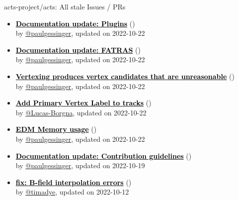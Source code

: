 \begin{frame}[allowframebreaks]{ acts-project/acts: All stale Issues / PRs}
\begin{itemize}
    \item\iss\prstale\textbf{\href{https://github.com/acts-project/acts/issues/1421}{\textcolor{black}{Documentation update: Plugins}}}
    (\href{https://github.com/acts-project/acts/issues/1421}{}) \\
    by \href{https://github.com/paulgessinger}{@paulgessinger}, updated on 2022-10-22

    \item\iss\prstale\textbf{\href{https://github.com/acts-project/acts/issues/1419}{\textcolor{black}{Documentation update: FATRAS}}}
    (\href{https://github.com/acts-project/acts/issues/1419}{}) \\
    by \href{https://github.com/paulgessinger}{@paulgessinger}, updated on 2022-10-22

    \item\iss\prstale\textbf{\href{https://github.com/acts-project/acts/issues/1361}{\textcolor{black}{Vertexing produces vertex candidates that are unreasonable}}}
    (\href{https://github.com/acts-project/acts/issues/1361}{}) \\
    by \href{https://github.com/paulgessinger}{@paulgessinger}, updated on 2022-10-22

    \item\iss\prstale\textbf{\href{https://github.com/acts-project/acts/issues/1544}{\textcolor{black}{Add Primary Vertex Label to tracks}}}
    (\href{https://github.com/acts-project/acts/issues/1544}{}) \\
    by \href{https://github.com/Lucas-Borgna}{@Lucas-Borgna}, updated on 2022-10-22

    \item\iss\prstale\textbf{\href{https://github.com/acts-project/acts/issues/1516}{\textcolor{black}{EDM Memory usage}}}
    (\href{https://github.com/acts-project/acts/issues/1516}{}) \\
    by \href{https://github.com/paulgessinger}{@paulgessinger}, updated on 2022-10-22

    \item\iss\prstale\textbf{\href{https://github.com/acts-project/acts/issues/1423}{\textcolor{black}{Documentation update: Contribution guidelines}}}
    (\href{https://github.com/acts-project/acts/issues/1423}{}) \\
    by \href{https://github.com/paulgessinger}{@paulgessinger}, updated on 2022-10-19

    \item\propen\prwip\prstale\textbf{\href{https://github.com/acts-project/acts/pull/1467}{\textcolor{black}{fix: B-field interpolation errors}}}
    (\href{https://github.com/acts-project/acts/pull/1467}{}) \\
    by \href{https://github.com/timadye}{@timadye}, updated on 2022-10-12


\end{itemize}
\end{frame}

